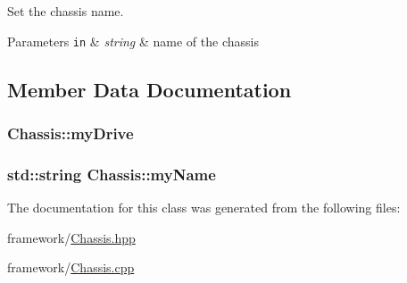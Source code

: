 Set the chassis name. 


\begin{DoxyParams}[1]{Parameters}
\mbox{\tt in}  & {\em string} & name of the chassis \\
\hline
\end{DoxyParams}


\subsection{Member Data Documentation}
\hypertarget{classChassis_a9cb7cd7d9c99a1eb67385600a3f86bc8}{
\subsubsection[{my\-Drive}]{ Chassis\-::my\-Drive\hspace{0.3cm}{\ttfamily [private]}}}\label{classChassis_a9cb7cd7d9c99a1eb67385600a3f86bc8}
\hypertarget{classChassis_ad902898daa957d3b7159df8d66b3a047}{
\subsubsection[{my\-Name}]{\setlength{\rightskip}{0pt plus 5cm}std\-::string Chassis\-::my\-Name\hspace{0.3cm}{\ttfamily [private]}}}\label{classChassis_ad902898daa957d3b7159df8d66b3a047}


The documentation for this class was generated from the following files\-:\begin{DoxyCompactItemize}
\item 
framework/\hyperlink{Chassis_8hpp}{Chassis.\-hpp}\item 
framework/\hyperlink{Chassis_8cpp}{Chassis.\-cpp}\end{DoxyCompactItemize}
